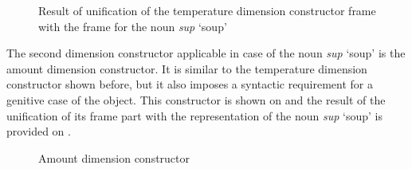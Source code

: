 \begin{figure}
\centering
{}
\caption{Result of unification of the temperature dimension constructor frame with the frame for the noun \textit{sup} `soup'  \label{frame:soup:temp}}
\end{figure}

The second dimension constructor applicable in case of the noun \textit{sup} `soup' is the amount dimension constructor. It is similar to the temperature dimension constructor shown before, but it also imposes a syntactic requirement for a genitive case of the object. This constructor is shown on  and the result of the unification of its frame part with the representation of the noun \textit{sup} `soup' is provided on .

\begin{figure}
\begin{minipage}{0.5\textwidth}
\end{minipage}\hspace{1em}\begin{minipage}{0.4\textwidth}
\end{minipage}
\caption{Amount dimension constructor \label{constructor:amount}}
\end{figure}

